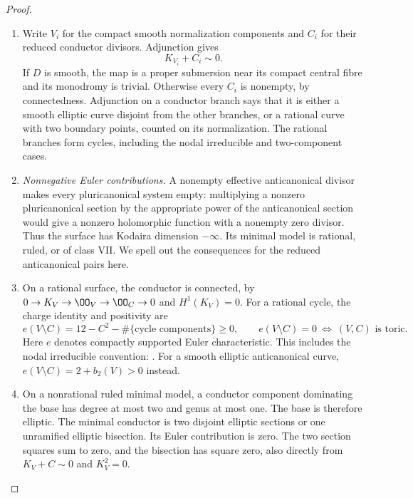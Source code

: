 \begin{proof}
\begin{enumerate}[label=\arabic*.,leftmargin=*]
\item Write $V_i$ for the compact smooth normalization
components and $C_i$ for their reduced conductor divisors.
Adjunction gives
\[
 K_{V_i}+C_i\sim0.                                  \tag{B.4.28.2}
\]
If $D$ is smooth, the map is a proper submersion near
its compact central fibre and its monodromy is trivial.
Otherwise every $C_i$ is nonempty, by connectedness.
Adjunction on a conductor branch says that it is either
a smooth elliptic curve disjoint from the other branches,
or a rational curve with two boundary points, counted
on its normalization. The rational branches form cycles,
including the nodal irreducible and two-component cases.

\item \emph{Nonnegative Euler contributions.}
A nonempty effective anticanonical divisor makes every
pluricanonical system empty: multiplying a nonzero
pluricanonical section by the appropriate power of the
anticanonical section would give a nonzero holomorphic
function with a nonempty zero divisor. Thus the surface
has Kodaira dimension $-\infty$. Its minimal model is
rational, ruled, or of class VII. We spell out the
consequences for the reduced anticanonical pairs here.

\item On a rational surface, the conductor is connected, by
$0\to K_V\to\OO_V\to\OO_C\to0$ and $H^1(K_V)=0$.
For a rational cycle, the charge identity and positivity
are
\[
 e(V\setminus C)=12-C^2-\#\{\text{cycle components}\}
 \ge0,\qquad
 e(V\setminus C)=0\ \Longleftrightarrow\ (V,C)
 \text{ is toric}.                                  \tag{B.4.28.3}
\]
Here $e$ denotes compactly supported Euler characteristic.
This includes the nodal irreducible convention:
\citet[Definition 1.1 and Lemmas 1.2, 2.2, 2.7]{Friedman2016AB}.
For a smooth elliptic anticanonical curve,
$e(V\setminus C)=2+b_2(V)>0$ instead.

\item On a nonrational ruled minimal model, a conductor
component dominating the base has degree at most two
and genus at most one. The base is therefore elliptic.
The minimal conductor is two disjoint elliptic sections
or one unramified elliptic bisection. Its Euler
contribution is zero. The two section squares sum to
zero, and the bisection has square zero, also directly
from $K_V+C\sim0$ and $K_V^2=0$.


\end{enumerate}
\end{proof}
